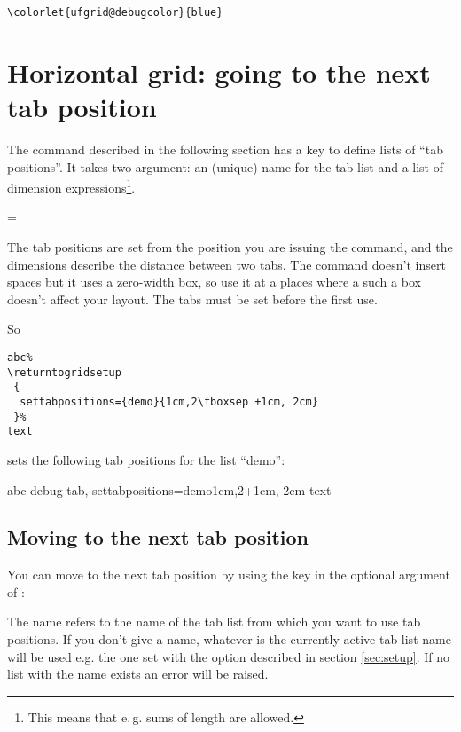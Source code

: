 \documentclass[twoside,parskip=half-,fontsize=12pt,egregdoesnotlikesansseriftitles,headings=normal]{scrartcl}
\begin{document}
\begin{lstlisting}
\colorlet{ufgrid@debugcolor}{blue}
\end{lstlisting}


\section{Horizontal grid: going to the next tab position}\label{sec:nextgridtab}

The  command described in the following section has a key to define lists of \enquote{tab positions}. It takes two argument: an (unique) name for the tab list and a list of dimension expressions\footnote{This means that e.\,g. sums of length are allowed.}.

=

The tab positions are set from the position you are issuing the command, and the dimensions describe the distance between two tabs. The command doesn't insert spaces but it uses a zero-width box, so use it at a places where a such a box doesn't affect your layout. The tabs must be set before the first use.


So

\begin{lstlisting}
abc%
\returntogridsetup
 {
  settabpositions={demo}{1cm,2\fboxsep +1cm, 2cm}
 }%
text
\end{lstlisting}

sets the following tab positions for the list \enquote{demo}:

abc%
\returntogridsetup
 {
  debug-tab,
  settabpositions={demo}{1cm,2\fboxsep +1cm, 2cm}
 }%
text

\subsection{Moving to the next tab position}

You can move to the next tab position by using the  key in the optional argument of :


\Macro\returntogrid[tab=\meta{name}]


The name refers to the name of the tab list from which you want to use tab positions. If you don't give a name, whatever is the currently active tab list name  will be used e.g. the one set with the  option described in section \ref{sec:setup}. If no list with the name exists an error will be raised.
\end{document}
